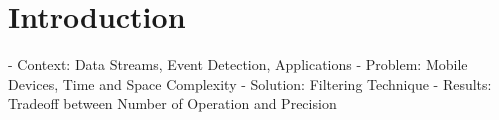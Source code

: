 \section{Introduction} \label{introduction}

- Context: Data Streams, Event Detection, Applications
- Problem: Mobile Devices, Time and Space Complexity
- Solution: Filtering Technique
- Results: Tradeoff between Number of Operation and Precision